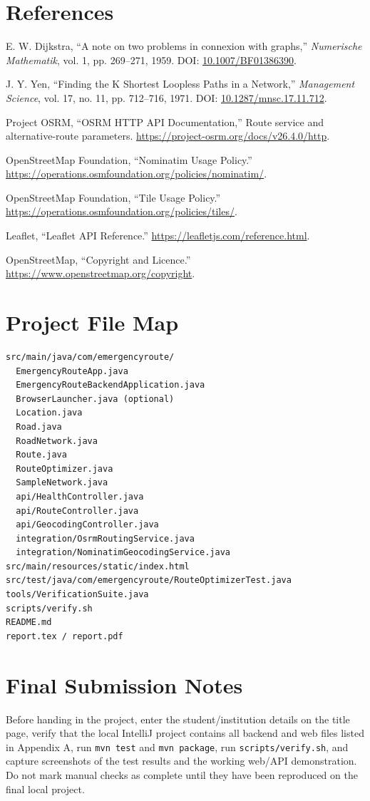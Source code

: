 \documentclass[11pt,a4paper]{article}
\begin{document}
\section*{References}
\begin{enumerate}[label={[\arabic*]}]
  \item E. W. Dijkstra, ``A note on two problems in connexion with graphs,'' \emph{Numerische Mathematik}, vol. 1, pp. 269--271, 1959. DOI: \href{https://doi.org/10.1007/BF01386390}{10.1007/BF01386390}.
  \item J. Y. Yen, ``Finding the K Shortest Loopless Paths in a Network,'' \emph{Management Science}, vol. 17, no. 11, pp. 712--716, 1971. DOI: \href{https://doi.org/10.1287/mnsc.17.11.712}{10.1287/mnsc.17.11.712}.
  \item Project OSRM, ``OSRM HTTP API Documentation,'' Route service and alternative-route parameters. \url{https://project-osrm.org/docs/v26.4.0/http}.
  \item OpenStreetMap Foundation, ``Nominatim Usage Policy.'' \url{https://operations.osmfoundation.org/policies/nominatim/}.
  \item OpenStreetMap Foundation, ``Tile Usage Policy.'' \url{https://operations.osmfoundation.org/policies/tiles/}.
  \item Leaflet, ``Leaflet API Reference.'' \url{https://leafletjs.com/reference.html}.
  \item OpenStreetMap, ``Copyright and Licence.'' \url{https://www.openstreetmap.org/copyright}.
\end{enumerate}

\appendix
\section{Project File Map}
\begin{lstlisting}[style=console]
src/main/java/com/emergencyroute/
  EmergencyRouteApp.java
  EmergencyRouteBackendApplication.java
  BrowserLauncher.java (optional)
  Location.java
  Road.java
  RoadNetwork.java
  Route.java
  RouteOptimizer.java
  SampleNetwork.java
  api/HealthController.java
  api/RouteController.java
  api/GeocodingController.java
  integration/OsrmRoutingService.java
  integration/NominatimGeocodingService.java
src/main/resources/static/index.html
src/test/java/com/emergencyroute/RouteOptimizerTest.java
tools/VerificationSuite.java
scripts/verify.sh
README.md
report.tex / report.pdf
\end{lstlisting}

\section{Final Submission Notes}
Before handing in the project, enter the student/institution details on the title page, verify that the local IntelliJ project contains all backend and web files listed in Appendix A, run \texttt{mvn test} and \texttt{mvn package}, run \texttt{scripts/verify.sh}, and capture screenshots of the test results and the working web/API demonstration. Do not mark manual checks as complete until they have been reproduced on the final local project.
\end{document}
